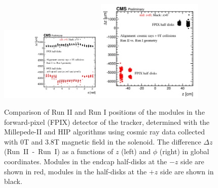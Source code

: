 \begin{figure}[htb]
    \begin{center}
        \includegraphics[width=0.45\textwidth]{../figs/Alignment/AlRes_phi_vs_dz_PXF_1.pdf}\includegraphics[width=0.45\textwidth]{../figs/Alignment/AlRes_z_vs_dz_PXF_1.png}
    \end{center}
    \caption{Comparison of Run II and Run I positions of the modules in the forward-pixel (FPIX) detector of the tracker, determined with the Millepede-II and HIP algorithms using cosmic ray data collected with 0T and 3.8T magnetic field in the solenoid. The difference $\Delta z$(Run~II~-~Run~I) as a functions of $z$ (left) and $\phi$ (right) in global coordinates. Modules in the endcap half-disks at the $-z$ side are shown in red, modules in the half-disks at the $+z$ side are shown in black.}
    \label{fig:GCP_FPIX}
\end{figure}

